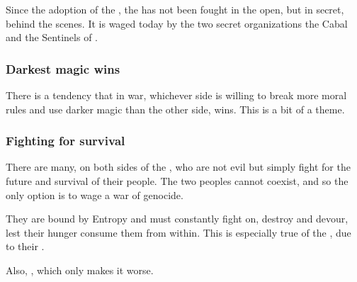Since the adoption of the , the \feud{} has not been fought in the open, but in secret, behind the scenes. It is waged today by the two secret organizations the Cabal and the Sentinels of \Miith{}. 






\subsubsection{Darkest magic wins}
There is a tendency that in war, whichever side is willing to break more moral rules and use darker magic than the other side, wins. 
This is a bit of a theme. 






\subsubsection{Fighting for survival}
There are many, on both sides of the , who are not evil but simply fight for the future and survival of their people. The two peoples cannot coexist, and so the only option is to wage a war of genocide. 

They are bound by Entropy and must constantly fight on, destroy and devour, lest their hunger consume them from within. 
This is especially true of the \resphain, due to their . 

Also, , which only makes it worse.


